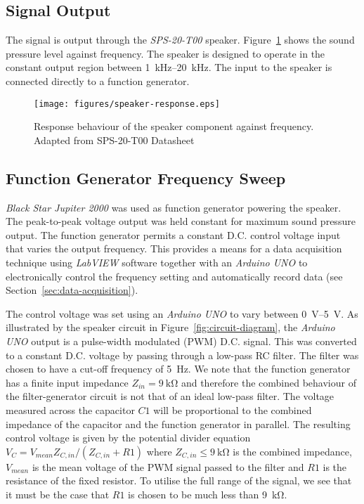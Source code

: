 \documentclass[twocolumn]{article}
\begin{document}
\subsection{Signal Output}
The signal is output through the \textit{SPS-20-T00} speaker. Figure~\ref{fig:speaker-response} shows the sound pressure level against frequency. The speaker is designed to operate in the constant output region between \SIrange{1}{20}{\kilo\hertz}. The input to the speaker is connected directly to a function generator.
\begin{figure}
    \centering
    \texttt{[image: figures/speaker-response.eps]}
    \caption{Response behaviour of the speaker component against frequency. Adapted from SPS-20-T00 Datasheet}
    \label{fig:speaker-response}
\end{figure}

\subsection{Function Generator Frequency Sweep} \label{sec:function-gen}
\textit{Black Star Jupiter 2000} was used as function generator powering the speaker. The peak-to-peak voltage output was held constant for maximum sound pressure output. The function generator permits a constant D.C. control voltage input that varies the output frequency. This provides a means for a data acquisition technique using \textit{LabVIEW} software together with an \textit{Arduino UNO} to electronically control the frequency setting and automatically record data (see Section~\ref{sec:data-acquisition}).

The control voltage was set using an \textit{Arduino UNO} to vary between \SIrange{0}{5}{\volt}. As illustrated by the speaker circuit in Figure~\ref{fig:circuit-diagram}, the \textit{Arduino UNO} output is a pulse-width modulated (PWM) D.C. signal. This was converted to a constant D.C. voltage by passing through a low-pass RC filter. The filter was chosen to have a cut-off frequency of \SI{5}{\hertz}. We note that the function generator has a finite input impedance $Z_{in} = \SI{9}{\kilo\ohm}$ and therefore the combined behaviour of the filter-generator circuit is not that of an ideal low-pass filter. The voltage measured across the capacitor $C1$ will be proportional to the combined impedance of the capacitor and the function generator in parallel. The resulting control voltage is given by the potential divider equation $V_C = V_{mean}Z_{C,in}/(Z_{C,in} + R1)$ where $Z_{C,in} \leq \SI{9}{\kilo\ohm}$ is the combined impedance, $V_{mean}$ is the mean voltage of the PWM signal passed to the filter and $R1$ is the resistance of the fixed resistor. To utilise the full range of the signal, we see that it must be the case that $R1$ is chosen to be much less than \SI{9}{\kilo\ohm}.
\end{document}
